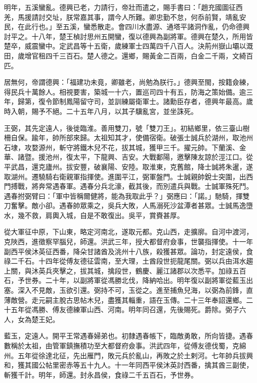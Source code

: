 \begin{pinyinscope}
明年，五溪蠻亂。德興已老，力請行，帝壯而遣之，賜手書曰：「趙充國圖征西羌，馬援請討交址，朕常嘉其事，謂今人所難。卿忠勤不怠，何忝前賢，靖亂安民，在此行也。」至五溪，蠻悉散走。會四川水盡源、通塔平諸洞作亂，仍命德興討平之。十八年，楚王楨討思州五開蠻，復以德興為副將軍。德興在楚久，所用皆楚卒，威震蠻中。定武昌等十五衛，歲練軍士四萬四千八百人。決荊州嶽山壩以溉田，歲增官租四千三百石。楚人德之。還鄉，賜黃金二百兩，白金二千兩，文綺百匹。

居無何，帝謂德興：「福建功未竟，卿雖老，尚勉為朕行。」德興至閩，按籍僉練，得民兵十萬餘人。相視要害，築城一十六，置巡司四十有五，防海之策始備。逾三年，歸第，復令節制鳳陽留守司，並訓練屬衛軍士。諸勳臣存者，德興年最高。歲時入朝，賜予不絕。二十五年八月，以其子驥亂宮，並坐誅死。

王弼，其先定遠人，後徙臨淮。善用雙刀，號「雙刀王」。初結鄉里，依三臺山樹柵自保。踰年，帥所部來歸。太祖知其才，使備宿衛。破張士誠兵於湖州，取池州石埭，攻婺源州，斬守將鐵木兒不花，拔其城，獲甲三千。擢元帥。下蘭溪、金華、諸暨。援池州，復太平，下龍興、吉安。大戰鄱陽，邀擊陳友諒於涇江口。從平武昌，還克廬州。拔安豐，破襄陽、安陸。取淮東，克舊館，降士誠將朱暹，遂取湖州。遷驍騎右衛親軍指揮使。進圍平江，弼軍盤門。士誠親帥銳士突圍，出西門搏戰，將奔常遇春軍。遇春分兵北濠，截其後，而別遣兵與戰。士誠軍殊死鬥。遇春拊弼臂曰：「軍中皆稱爾健將，能為我取此乎？」弼應曰：「諾。」馳騎，揮雙刀奮擊。敵小卻。遇春帥眾乘之，吳兵大敗，人馬溺死沙盆潭者甚眾。士誠馬逸墮水，幾不救，肩輿入城，自是不敢復出。吳平，賞賚甚厚。

從大軍征中原，下山東，略定河南北，遂取元都。克山西，走擴廓。自河中渡河，克陜西，進徵察罕腦兒，師還。洪武三年，授大都督府僉事，世襲指揮使。十一年副西平侯沐英征西番，降朵甘諸酋及洮州十八族，殺獲甚眾。論功，封定遠侯，食祿二千石。十四年從傅友德征雲南，至大理，土酋段世扼龍尾關。弼以兵由洱水趨上關，與沐英兵夾擊之，拔其城，擒段世，鶴慶、麗江諸郡以次悉平。加祿五百石，予世券。二十年，以副將軍從馮勝北伐，降納哈出。明年復以副將軍從藍玉出塞。深入不見敵，玉欲引還。弼持不可，玉從之。進至捕魚兒海，以弼為前鋒，直薄敵營。走元嗣主脫古思帖木兒，盡獲其輜重，語在玉傳。二十三年奉詔還鄉。二十五年從馮勝、傅友德練軍山西、河南。明年同召還，先後賜死。爵除。弼子六人，女為楚王妃。

藍玉，定遠人。開平王常遇春婦弟也。初隸遇春帳下，臨敵勇敢，所向皆捷。遇春數稱於太祖，由管軍鎮撫積功至大都督府僉事。洪武四年，從傅友德伐蜀，克綿州。五年從徐達北征，先出雁門，敗元兵於亂山，再敗之於土剌河。七年帥兵拔興和，獲其國公帖里密赤等五十九人。十一年同西平侯沐英討西番，擒其酋三副使，斬獲千計。明年，師還。封永昌侯，食祿二千五百石，予世券。


\end{pinyinscope}
